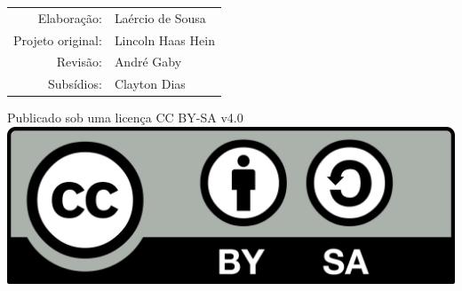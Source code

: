 \clearpage

\thispagestyle{empty}

\begin{center}
  \begin{tabular}{rl}
    Elaboração:       & Laércio de Sousa  \\
    Projeto original: & Lincoln Haas Hein \\
    Revisão:          & André Gaby        \\
    Subsídios:        & Clayton Dias      \\
  \end{tabular}

  \vspace{1cm}

  Publicado sob uma licença CC BY-SA v4.0 \\[\baselineskip] \includegraphics[scale=0.07]{cc-by-sa-icon.png}
\end{center}